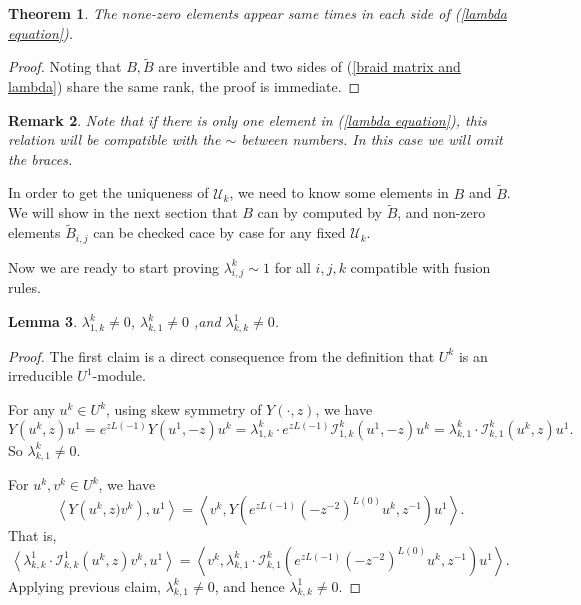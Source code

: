 \documentclass{article}
\newtheorem{lemma}{Lemma}[section]
\newtheorem{theorem}[lemma]{Theorem}
\newtheorem{remark}[lemma]{Remark}
\begin{document}
\begin{theorem}\label{samerank}
The none-zero elements appear same times in each side of (\ref{lambda equation}).
\end{theorem}
\begin{proof}
Noting that $B,\tilde{B}$ are invertible and two sides of (\ref{braid matrix and lambda}) share the same rank, the proof is immediate.
\end{proof}

\begin{remark}
Note that if there is only one element in (\ref{lambda equation}), this relation will be compatible with the $\sim$ between numbers.
In this case we will omit the braces.
\end{remark}

In order to get the uniqueness of $\mathcal{U}_k$,
we need to know some elements in $B$ and $\tilde{B}$.
We will show in the next section that $B$ can by computed by $\tilde{B}$,
and non-zero elements $\tilde{B}_{i,j}$ can be checked cace by case for any fixed $\mathcal{U}_k$.

Now we are ready to start proving $\lambda_{i,j}^k\sim 1$ for all $i,j,k$ compatible with fusion rules.

\begin{lemma}
$\lambda_{1,k}^{k}\neq 0$,
$\lambda_{k,1}^{k}\neq 0$ 
,and $\lambda_{k,k}^{1}\neq 0$.
\end{lemma}
\begin{proof}
The first claim is a direct consequence from the definition that $U^k$ is an irreducible $U^1$-module.

For any $u^{k}\in U^k$, using skew symmetry of $Y\left(\cdot,z\right)$,
we have
\[
Y(u^{k},z)u^{1}=e^{zL\left(-1\right)}Y\left(u^{1},-z\right)u^{k}=\lambda_{1,k}^{k}\cdot e^{zL\left(-1\right)}\mathcal{I}_{1,k}^{k}\left(u^{1},-z\right)u^{k}=\lambda_{k,1}^{k}\cdot\mathcal{I}_{k,1}^{k}\left(u^{k},z\right)u^{1}.
\]
So $\lambda_{k,1}^{k}\not=0$.

For $u^{k},v^{k}\in U^k$, we have
\[
\left\langle Y\left(u^{k},z)v^{k}\right),u^{1}\right\rangle =\left\langle v^{k},Y\left(e^{zL\left(-1\right)}\left(-z^{-2}\right)^{L\left(0\right)}u^{k},z^{-1}\right)u^{1}\right\rangle .
\]
That is,
\[
\left\langle \lambda_{k,k}^{1}\cdot\mathcal{I}_{k,k}^{1}\left(u^{k},z\right)v^{k},u^{1}\right\rangle =\left\langle v^{k},\lambda_{k,1}^{k}\cdot\mathcal{I}_{k,1}^{k}\left(e^{zL\left(-1\right)}\left(-z^{-2}\right)^{L\left(0\right)}u^{k},z^{-1}\right)u^{1}\right\rangle .
\]
Applying previous claim, $\lambda_{k,1}^{k}\not=0$, and hence $\lambda_{k,k}^{1}\not=0$.
\end{proof}
\end{document}
